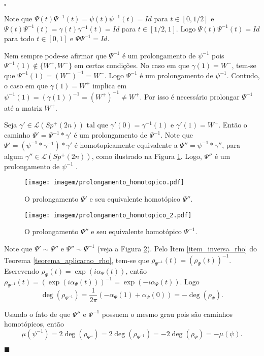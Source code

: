 \documentclass[12pt]{book}
\newenvironment{prova}[1]{$\square$ #1}{\hfill$\blacksquare$}
\newcommand{\caminhos}{\mathcal{L}}
\newcommand{\gruposimpleticonaodegenerado}[1]{Sp^{#1}(2n)}
\newcommand{\intervalo}{[0,1]}
\begin{document}
\begin{prova}
\begin{enumerate}
			Note que $\Psi(t)\Psi^{-1}(t) = \psi(t)\psi^{-1}(t) = Id$ para $t \in [0,1/2]$ e $\Psi(t)\Psi^{-1}(t) = \gamma(t)\gamma^{-1}(t) = Id$ para $t \in [1/2,1]$. Logo $\Psi(t)\Psi^{-1}(t) = Id$ para todo $t \in \intervalo$ e $\Psi\Psi^{-1} = Id$.
			
			Nem sempre pode-se afirmar que $\Psi^{-1}$ é um prolongamento de $\psi^{-1}$ pois $\Psi^{-1}(1)\notin\{W^{+},W^{-}\}$ em certas condições. No caso em que $\gamma(1)=W^{-}$, tem-se que $\Psi^{-1}(1) = (W^{-})^{-1}=W^{-}$. Logo $\Psi^{-1}$ é um prolongamento de $\psi^{-1}$. Contudo, o caso em que $\gamma(1)=W^{+}$ implica em $\psi^{-1}(1)= (\gamma(1))^{-1}=(W^{+})^{-1} \neq W^{+}$. Por isso é necessário prolongar $\Psi^{-1}$ até a matriz $W^{+}$.
			
			Seja $\gamma'\in \caminhos(\gruposimpleticonaodegenerado{+})$ tal que $\gamma'(0) = \gamma^{-1}(1)$ e $\gamma'(1)=W^{+}$. Então o caminho $\Psi'=\Psi^{-1}*\gamma'$ é um prolongamento de $\Psi^{-1}$. Note que $\Psi' = (\psi^{-1}*\gamma^{-1})*\gamma'$ é homotopicamente equivalente a $\Psi'' = \psi^{-1}*\gamma''$, para algum $\gamma''\in \caminhos(\gruposimpleticonaodegenerado{+})$, como ilustrado na Figura	 \ref{figura_prolongamento_homotopico}. Logo, $\Psi''$ é um prolongamento de $\psi^{-1}$ .  
			
			\begin{figure}[!h]
				\centering
				\texttt{[image: imagem/prolongamento\_homotopico.pdf]}
				\caption{O prolongamento $\Psi'$ e seu equivalente homotópico $\Psi''$.}
				\label{figura_prolongamento_homotopico}
			\end{figure}
			
			\begin{figure}[!h]
				\centering
				\texttt{[image: imagem/prolongamento\_homotopico\_2.pdf]}
				\caption{O prolongamento $\Psi''$ e seu equivalente homotópico $\Psi^{-1}$.}
				\label{figura_prolongamento_homotopico_2}
			\end{figure}
			
		
			
			Note que $\Psi'\sim \Psi''$ e $\Psi''\sim \Psi^{-1}$ (veja a Figura \ref{figura_prolongamento_homotopico_2}). Pelo Item \ref{item_inversa_rho} do Teorema \ref{teorema_aplicacao_rho}, tem-se que $\rho_{\Psi^{-1}}(t) = (\rho_{\Psi}(t))^{-1}$. Escrevendo $\rho_{\Psi}(t) = \exp(i\alpha_{\Psi}(t))$, então $\rho_{\Psi^{-1}}(t) =(\exp(i\alpha_{\Psi}(t)))^{-1}= \exp(-i\alpha_{\Psi}(t))$. Logo 
			$$
			\deg(\rho_{\Psi^{-1}})=\frac{1}{2\pi}(-\alpha_{\Psi}(1)+\alpha_{\Psi}(0)) =  -\deg(\rho_{\Psi}).
			$$
			
			Usando o fato de que $\Psi''$ e $\Psi^{-1}$ possuem o mesmo grau pois são caminhos homotópicos, então
			$$
			\mu(\psi^{-1})=2\deg(\rho_{\Psi''}) = 2\deg(\rho_{\Psi^{-1}}) = -2\deg(\rho_{\Psi})= -\mu(\psi).
			$$
		\end{enumerate}
	\end{prova}
	
\end{document}
